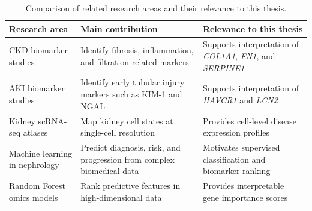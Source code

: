 \begin{table}[H]
\centering
\caption{Comparison of related research areas and their relevance to this thesis.}
\label{tab:related_works}
\begin{tabularx}{\textwidth}{lXX}
\toprule
Research area & Main contribution & Relevance to this thesis \\
\midrule
CKD biomarker studies & Identify fibrosis, inflammation, and filtration-related markers & Supports interpretation of \textit{COL1A1}, \textit{FN1}, and \textit{SERPINE1} \\
AKI biomarker studies & Identify early tubular injury markers such as KIM-1 and NGAL & Supports interpretation of \textit{HAVCR1} and \textit{LCN2} \\
Kidney scRNA-seq atlases & Map kidney cell states at single-cell resolution & Provides cell-level disease expression profiles \\
Machine learning in nephrology & Predict diagnosis, risk, and progression from complex biomedical data & Motivates supervised classification and biomarker ranking \\
Random Forest omics models & Rank predictive features in high-dimensional data & Provides interpretable gene importance scores \\
\bottomrule
\end{tabularx}
\end{table}
